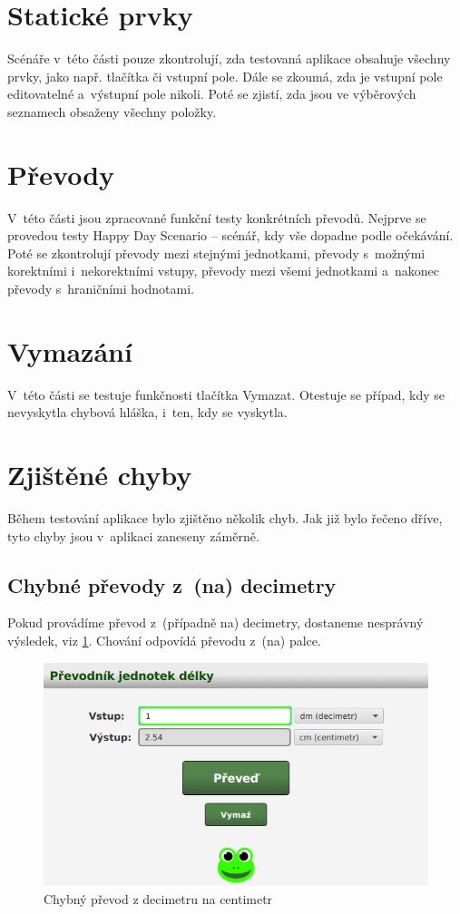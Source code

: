 	\section{Statické prvky}
	Scénáře v~této části pouze zkontrolují, zda testovaná aplikace obsahuje všechny prvky, jako např. tlačítka či vstupní pole. Dále se zkoumá, zda je vstupní pole editovatelné a~výstupní pole nikoli. Poté se zjistí, zda jsou ve výběrových seznamech obsaženy všechny položky.
	
	\section{Převody}
	V~této části jsou zpracované funkční testy konkrétních převodů. Nejprve se provedou testy Happy Day Scenario -- scénář, kdy vše dopadne podle očekávání. Poté se zkontrolují převody mezi stejnými jednotkami, převody s~možnými korektními i~nekorektními vstupy, převody mezi všemi jednotkami a~nakonec převody s~hraničními hodnotami.
	
	\section{Vymazání}
	V~této části se testuje funkčnosti tlačítka Vymazat. Otestuje se případ, kdy se nevyskytla chybová hláška, i~ten, kdy se vyskytla.
	
	\section{Zjištěné chyby}
	Během testování aplikace bylo zjištěno několik chyb. Jak již bylo řečeno dříve, tyto chyby jsou v~aplikaci zaneseny záměrně.
	
		\subsection{Chybné převody z~(na) decimetry}
		Pokud provádíme převod z~(případně na) decimetry, dostaneme nesprávný výsledek, viz \ref{ChybaDm}. Chování odpovídá převodu z~(na) palce.
			\begin{figure}[ht!]
				\centering
				\caption{Chybný převod z decimetru na centimetr}
				\label{ChybaDm}
				\includegraphics[width=13.5cm]{img/Chyby/Dm.png}
			\end{figure}
		
